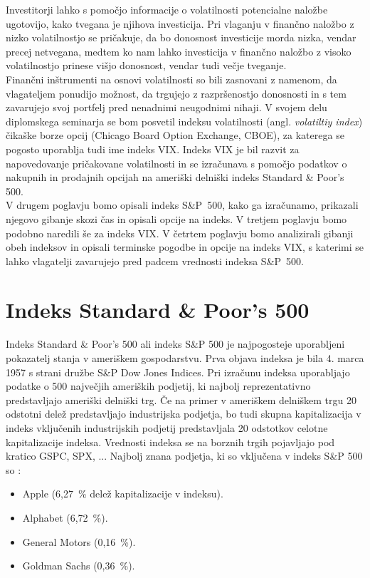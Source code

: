 \documentclass[12pt,a4paper, reqno]{amsart}
\theoremstyle{definition} %
\theoremstyle{plain} %
\begin{document}
Investitorji lahko s pomočjo informacije o volatilnosti potencialne naložbe ugotovijo, kako tvegana je njihova investicija. Pri vlaganju v finančno naložbo z nizko volatilnostjo se pričakuje, da bo donosnost investicije morda nizka, vendar precej netvegana, medtem ko nam lahko investicija v finančno naložbo z visoko volatilnostjo prinese višjo donosnost, vendar tudi večje tveganje.\\

Finančni inštrumenti na osnovi volatilnosti so bili zasnovani z namenom, da vlagateljem ponudijo možnost, da trgujejo z razpršenostjo donosnosti in s tem zavarujejo svoj portfelj pred nenadnimi neugodnimi nihaji. V svojem delu diplomskega seminarja se bom posvetil indeksu volatilnosti (angl. \textit{volatiltiy index}) čikaške borze opcij (Chicago Board Option Exchange, CBOE), za katerega se pogosto uporablja tudi ime indeks VIX.
Indeks VIX je bil razvit za napovedovanje pričakovane volatilnosti in se izračunava s pomočjo podatkov o nakupnih in prodajnih opcijah na ameriški delniški indeks Standard \& Poor's 500.\\

V drugem poglavju bomo opisali indeks S\&P~500, kako ga izračunamo, prikazali njegovo gibanje skozi čas in opisali opcije na indeks. V tretjem poglavju bomo podobno naredili še za indeks VIX. V četrtem poglavju bomo analizirali gibanji obeh indeksov in opisali terminske pogodbe in opcije na indeks VIX, s katerimi se lahko vlagatelji zavarujejo pred padcem vrednosti indeksa S\&P~500.


\section{Indeks Standard \& Poor's 500}
Indeks Standard \& Poor's 500 ali indeks S\&P 500 je najpogosteje uporabljeni pokazatelj stanja v ameriškem gospodarstvu. Prva objava indeksa je bila 4. marca 1957 s strani družbe S\&P Dow Jones Indices. Pri izračunu indeksa uporabljajo podatke o 500 največjih ameriških podjetij, ki najbolj reprezentativno predstavljajo ameriški delniški trg. Če na primer v ameriškem delniškem trgu 20 odstotni delež predstavljajo industrijska podjetja, bo tudi skupna kapitalizacija v indeks vključenih industrijskih podjetij predstavljala 20 odstotkov celotne kapitalizacije indeksa.
Vrednosti indeksa se na borznih trgih pojavljajo pod kratico GSPC, SPX, ... 
Najbolj znana podjetja, ki so vključena v indeks S\&P 500 so \cite{spx_companies}:
\begin{itemize}
\item Apple (6,27~\% delež kapitalizacije v indeksu).\\

\item Alphabet (6,72~\%).\\

\item General Motors (0,16~\%).\\

\item Goldman Sachs (0,36~\%).\\
\end{itemize}
\end{document}
